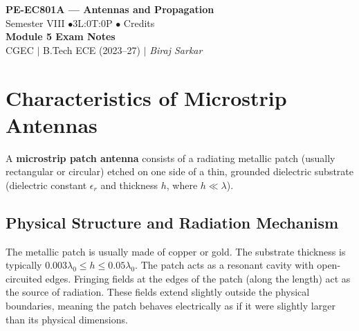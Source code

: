\documentclass[12pt,a4paper]{article}
\begin{document}

\begin{center}
  {\LARGE\bfseries\color{myred} PE-EC801A --- Antennas and Propagation}\\[5pt]
  {\normalsize\color{mydark} Semester VIII \quad$\bullet$\quad 3L:0T:0P \quad$\bullet$ Credits}\\[3pt]
  {\normalsize\color{myteal}\textbf{Module 5 Exam Notes}}\\[3pt]
  {\small\color{mydark} CGEC \;$|$\; B.Tech ECE (2023--27) \;$|$\; \textit{Biraj Sarkar}}
\end{center}
\vspace{2pt}
\noindent{\color{myred}\rule{\linewidth}{1.5pt}}
\vspace{2pt}

\hypersetup{linkcolor=mydark}
\tableofcontents
\hypersetup{linkcolor=myteal}
\newpage

\section{Characteristics of Microstrip Antennas}

\begin{tcolorbox}[defbox, title={\textbf{Definition of Microstrip Patch Antenna}}]
A \textbf{microstrip patch antenna} consists of a radiating metallic patch (usually rectangular or circular) etched on one side of a thin, grounded dielectric substrate (dielectric constant $\epsilon_r$ and thickness $h$, where $h \ll \lambda$).
\end{tcolorbox}

\subsection{Physical Structure and Radiation Mechanism}
The metallic patch is usually made of copper or gold. The substrate thickness is typically $0.003\lambda_0 \le h \le 0.05\lambda_0$.
The patch acts as a resonant cavity with open-circuited edges. Fringing fields at the edges of the patch (along the length) act as the source of radiation. These fields extend slightly outside the physical boundaries, meaning the patch behaves electrically as if it were slightly larger than its physical dimensions.
\end{document}
